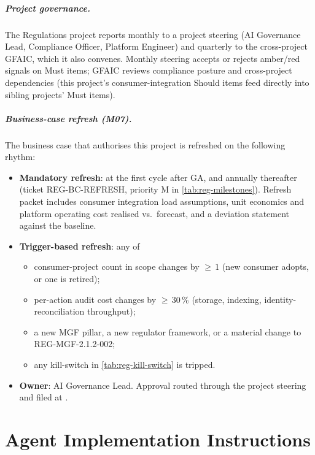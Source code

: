 \documentclass[11pt,a4paper,twoside]{report}
\begin{document}
\paragraph{Project governance.}
The Regulations project reports monthly to a project steering (AI
Governance Lead, Compliance Officer, Platform Engineer) and quarterly
to the cross-project GFAIC, which it also convenes. Monthly steering
accepts or rejects amber/red signals on Must items; GFAIC reviews
compliance posture and cross-project dependencies (this project's
consumer-integration Should items feed directly into sibling projects'
Must items).

\paragraph{Business-case refresh (M07).}
The business case that authorises this project is refreshed on the
following rhythm:

\begin{itemize}
\item \textbf{Mandatory refresh}: at the first cycle after GA, and
annually thereafter (ticket REG-BC-REFRESH, priority M in
\cref{tab:reg-milestones}). Refresh packet includes consumer
integration load assumptions, unit economics
and platform operating cost
realised vs.\ forecast, and a deviation statement against the
baseline.
\item \textbf{Trigger-based refresh}: any of
\begin{itemize}
\item consumer-project count in scope changes by $\ge\,1$
(new consumer adopts, or one is retired);
\item per-action audit cost changes by $\ge\,30$\,\%
(storage, indexing, identity-reconciliation throughput);
\item a new MGF pillar, a new regulator framework, or a
material change to REG-MGF-2.1.2-002;
\item any kill-switch in \cref{tab:reg-kill-switch} is
tripped.
\end{itemize}
\item \textbf{Owner}: AI Governance Lead. Approval routed through
the project steering and filed at
.
\end{itemize}
\chapter{Agent Implementation Instructions}\label{ch:agent-impl}
\end{document}
